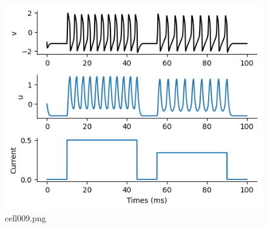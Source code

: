 \begin{figure}[ht]
	\centering
	\includegraphics[scale=0.8, max width=\linewidth]{./fig/neuron-model/fhn/cell009.png}
	\caption{cell009.png}
	\label{cell009.png}
\end{figure}